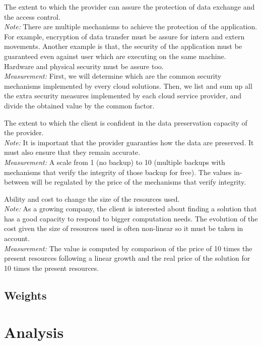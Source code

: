 \documentclass[a4paper,11pt]{article}
\begin{document}
\begin{description}[parsep=1pt,listparindent=\parindent,labelindent=\parindent,font=$\bullet$\ ]
  \item[Security:] The extent to which the provider can assure the protection of data exchange and the access control.\\
    \emph{Note:} There are multiple mechanisms to achieve the protection of the application. For example, encryption of data transfer must be assure for intern and extern movements. Another example is that, the security of the application must be guaranteed even against user which are executing on the same machine. Hardware and physical security must be assure too. \\
    \emph{Measurement:} First, we will determine which are the common security mechanisms implemented by every cloud solutions. Then, we list and sum up all the extra security measures implemented by each cloud service provider, and divide the obtained value by the common factor.

  \item[Data Integrity:] The extent to which the client is confident in the data preservation capacity of the provider.\\
    \emph{Note:} It is important that the provider guaranties how the data are preserved. It must also ensure that they remain accurate.\\ 
    \emph{Measurement:} A scale from 1 (no backup) to 10 (multiple backups with mechanisms that verify the integrity of those backup for free). The values in-between will be regulated by the price of the mechanisms that verify integrity.

  \item[Scalability:] Ability and cost to change the size of the resources used.\\
    \emph{Note:} As a growing company, the client is interested about finding a solution that has a good capacity to respond to bigger computation needs. The evolution of the cost given the size of resources used is often non-linear so it must be taken in account.\\
    \emph{Measurement:} The value is computed by comparison of the price of 10 times the present resources following a linear growth and the real price of the solution for 10 times the present resources.

\end{description}


\subsection{Weights}


\section{Analysis}
\end{document}
